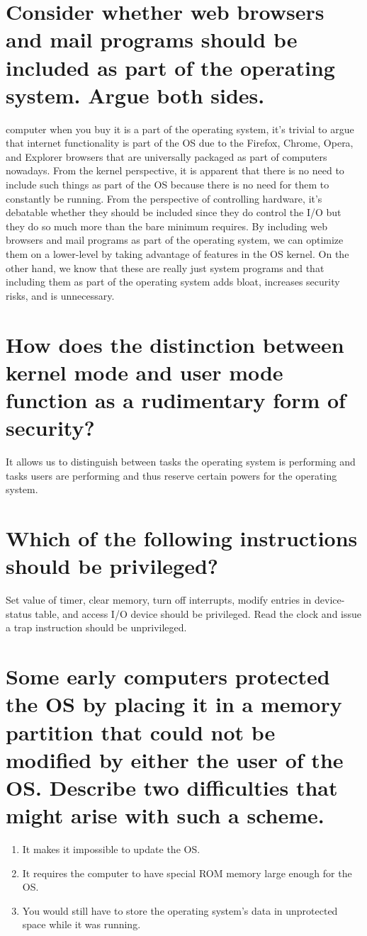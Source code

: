 \documentclass{book}%
\begin{document}
\section{Consider whether web browsers and mail programs should be included
as part of the operating system. Argue both sides.}
computer when you buy it is a part of the operating system, it's trivial to 
argue that internet functionality is part of the OS due to the Firefox, Chrome,
Opera, and Explorer browsers that are universally packaged as part of computers 
nowadays. From the kernel perspective, it is apparent that there is no need to
include such things as part of the OS because there is no need for them to 
constantly be running. From the perspective of controlling hardware, it's 
debatable whether they should be included since they do control the I/O but they
do so much more than the bare minimum requires.
By including web browsers and mail programs as part of the operating system, we 
can optimize them on a lower-level by taking advantage of features in the OS 
kernel. On the other hand, we know that these are really just system programs 
and that including them as part of the operating system adds bloat, increases 
security risks, and is unnecessary. 
\section{How does the distinction between kernel mode and user mode function 
as a rudimentary form of security?}
It allows us to distinguish between tasks the operating system is performing and
tasks users are performing and thus reserve certain powers for the operating 
system.
\section{Which of the following instructions should be privileged?}
Set value of timer, clear memory, turn off interrupts, modify entries in 
device-status table, and access I/O device should be privileged. Read the clock 
and issue a trap instruction should be unprivileged.
\section{Some early computers protected the OS by placing it in a memory 
partition that could not be modified by either the user of the OS. Describe two 
difficulties that might arise with such a scheme.}
\begin{enumerate}
\item It makes it impossible to update the OS.
\item It requires the computer to have special ROM memory large enough for the 
OS.
\item You would still have to store the operating system's data in unprotected 
space while it was running.
\end{enumerate}
\end{document}
